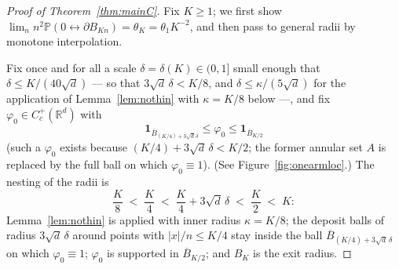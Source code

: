 \documentclass[11pt]{article}
\theoremstyle{definition}
\theoremstyle{remark}
\newcommand{\R}{\mathbb{R}}
\newcommand{\bP}{\mathbb{P}}
\newcommand{\Cc}{C_c^+(\R^d)}
\numberwithin{equation}{section}
\theoremstyle{plain}
\theoremstyle{definition}
\theoremstyle{remark}
\theoremstyle{plain}
\begin{document}
\begin{proof}[Proof of Theorem~\ref{thm:mainC}]
Fix $K\ge1$; we first show $\lim_n n^2\bP(0\leftrightarrow\partial
B_{Kn})=\theta_K=\theta_1K^{-2}$, and then pass to general radii by monotone
interpolation.

Fix once and for all a scale $\delta=\delta(K)\in(0,1]$ small enough
that $\delta\le K/(40\sqrt d)$ --- so that $3\sqrt d\,\delta<K/8$, and
$\delta\le\kappa/(5\sqrt d)$ for the application of Lemma~\ref{lem:nothin}
with $\kappa=K/8$ below ---, and fix
$\varphi_0\in\Cc$ with
\[
\mathbf 1_{\overline B_{(K/4)+3\sqrt d\,\delta}}\le\varphi_0\le\mathbf 1_{\overline B_{K/2}}
\]
(such a $\varphi_0$ exists because $(K/4)+3\sqrt d\,\delta<K/2$; the
former annular set $A$ is replaced by the full ball on which
$\varphi_0\equiv1$). (See Figure~\ref{fig:onearmloc}.)
The nesting of the radii is
\[
\frac K8\;<\;\frac K4\;<\;\frac K4+3\sqrt d\,\delta\;<\;\frac K2\;<\;K:
\]
Lemma~\ref{lem:nothin} is applied with inner radius $\kappa=K/8$; the deposit
balls of radius $3\sqrt d\,\delta$ around points with $|x|/n\le K/4$ stay
inside the ball $\overline B_{(K/4)+3\sqrt d\,\delta}$ on which $\varphi_0\equiv1$;
$\varphi_0$ is supported in $\overline B_{K/2}$; and $B_K$ is the exit radius.


\end{proof}
\end{document}
